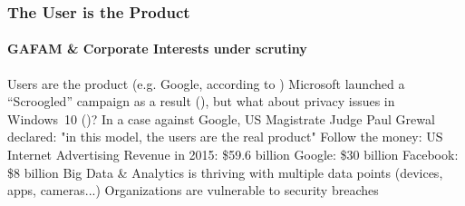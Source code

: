 	\begin{frame}
	\frametitle{The User is the Product}
	\framesubtitle{GAFAM \& Corporate Interests under scrutiny}
		\begin{outline}
			\1 Users are the product (e.g. Google, according to \cite{forbes:google})
			\1 Microsoft launched a ``Scroogled'' campaign as a result (\cite{bi:microsoft}), but what about privacy issues in Windows~10 (\cite{zdnet:windows})?
			\1 In a case against Google, US Magistrate Judge Paul Grewal declared: "in this model, the users are the real product"
			\1 Follow the money:
				\2 US Internet Advertising Revenue in 2015: \$59.6 billion
				\2 Google: \$30 billion
				\2 Facebook: \$8 billion
			\1 Big Data \& Analytics is thriving with multiple data points (devices, apps, cameras...)
			\1 Organizations are vulnerable to security breaches
		\end{outline}
	\end{frame}



